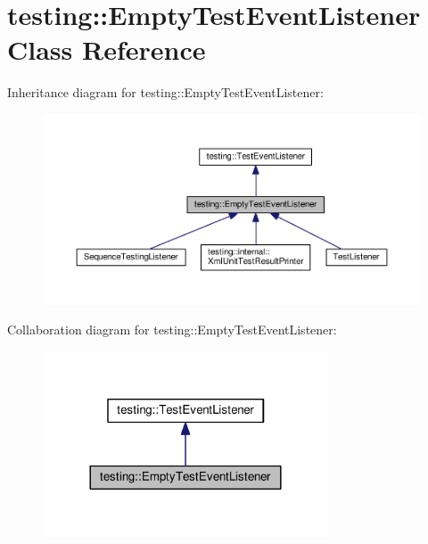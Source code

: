 \hypertarget{classtesting_1_1_empty_test_event_listener}{}\section{testing\+:\+:Empty\+Test\+Event\+Listener Class Reference}
\label{classtesting_1_1_empty_test_event_listener}


Inheritance diagram for testing\+:\+:Empty\+Test\+Event\+Listener\+:
\nopagebreak
\begin{figure}[H]
\begin{center}
\leavevmode
\includegraphics[width=350pt]{classtesting_1_1_empty_test_event_listener__inherit__graph}
\end{center}
\end{figure}


Collaboration diagram for testing\+:\+:Empty\+Test\+Event\+Listener\+:
\nopagebreak
\begin{figure}[H]
\begin{center}
\leavevmode
\includegraphics[width=240pt]{classtesting_1_1_empty_test_event_listener__coll__graph}
\end{center}
\end{figure}
